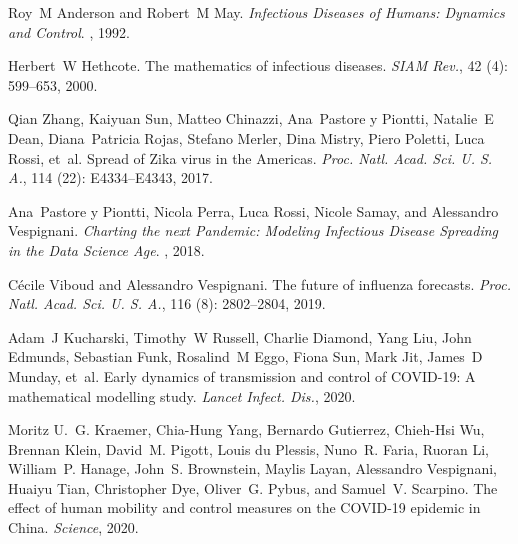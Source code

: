 Roy~M Anderson and Robert~M May.
\newblock \emph{Infectious Diseases of Humans: Dynamics and Control}.
, 1992.

Herbert~W Hethcote.
\newblock The mathematics of infectious diseases.
\newblock \emph{SIAM Rev.}, 42 (4): 599--653, 2000.

Qian Zhang, Kaiyuan Sun, Matteo Chinazzi, Ana~Pastore {y Piontti}, Natalie~E
Dean, Diana~Patricia Rojas, Stefano Merler, Dina Mistry, Piero Poletti, Luca
Rossi, et~al.
\newblock Spread of {{Zika}} virus in the {{Americas}}.
\newblock \emph{Proc. Natl. Acad. Sci. U. S. A.}, 114 (22):
E4334--E4343, 2017{}.

Ana~Pastore {y Piontti}, Nicola Perra, Luca Rossi, Nicole Samay, and Alessandro
Vespignani.
\newblock \emph{Charting the next Pandemic: {{Modeling}} Infectious Disease
    Spreading in the Data Science Age}.
, 2018.

C{\'e}cile Viboud and Alessandro Vespignani.
\newblock The future of influenza forecasts.
\newblock \emph{Proc. Natl. Acad. Sci. U. S. A.}, 116 (8):
2802--2804, 2019.

Adam~J Kucharski, Timothy~W Russell, Charlie Diamond, Yang Liu, John Edmunds,
Sebastian Funk, Rosalind~M Eggo, Fiona Sun, Mark Jit, James~D Munday, et~al.
\newblock Early dynamics of transmission and control of {{COVID}}-19: A
mathematical modelling study.
\newblock \emph{Lancet Infect. Dis.}, 2020.

Moritz U.~G. Kraemer, Chia-Hung Yang, Bernardo Gutierrez, Chieh-Hsi Wu, Brennan
Klein, David~M. Pigott, Louis {du Plessis}, Nuno~R. Faria, Ruoran Li,
William~P. Hanage, John~S. Brownstein, Maylis Layan, Alessandro Vespignani,
Huaiyu Tian, Christopher Dye, Oliver~G. Pybus, and Samuel~V. Scarpino.
\newblock The effect of human mobility and control measures on the {{COVID}}-19
epidemic in {{China}}.
\newblock \emph{Science}, 2020.

